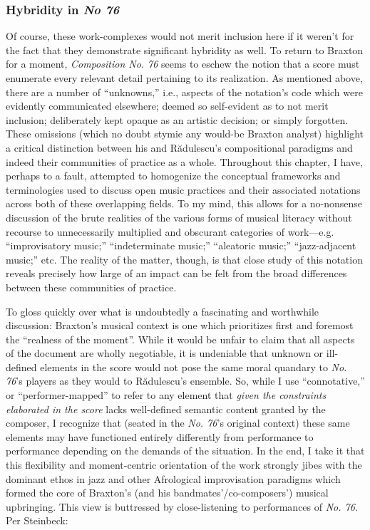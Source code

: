 
    \subsubsection{Hybridity in \textit{No 76}}

        Of course, these work-complexes would not merit inclusion here if it weren't for the fact that they demonstrate significant hybridity as well. To return to Braxton for a moment, \textit{Composition No. 76} seems to eschew the notion that a score must enumerate every relevant detail pertaining to its realization. As mentioned above, there are a number of ``unknowns,'' i.e., aspects of the notation's code which were evidently communicated elsewhere; deemed so self-evident as to not merit inclusion; deliberately kept opaque as an artistic decision; or simply forgotten. These omissions (which no doubt stymie any would-be Braxton analyst) highlight a critical distinction between his and R\u{a}dulescu's compositional paradigms and indeed their communities of practice as a whole. Throughout this chapter, I have, perhaps to a fault, attempted to homogenize the conceptual frameworks and terminologies used to discuss open music practices and their associated notations across both of these overlapping fields. To my mind, this allows for a no-nonsense discussion of the brute realities of the various forms of musical literacy without recourse to unnecessarily multiplied and obscurant categories of work---e.g. ``improvisatory music;'' ``indeterminate music;'' ``aleatoric music;'' ``jazz-adjacent music;'' etc. The reality of the matter, though, is that close study of this notation reveals precisely how large of an impact can be felt from the broad differences between these communities of practice.

        To gloss quickly over what is undoubtedly a fascinating and worthwhile discussion: Braxton's musical context is one which prioritizes first and foremost the ``realness of the moment''.\autocite[149]{Braxton_1988} While it would be unfair to claim that all aspects of the document are wholly negotiable, it is undeniable that unknown or ill-defined elements in the score would not pose the same moral quandary to \textit{No. 76}'s players as they would to R\u{a}dulescu's ensemble. So, while I use ``connotative,'' or ``performer-mapped'' to refer to any element that \textit{given the constraints elaborated in the score} lacks well-defined semantic content granted by the composer, I recognize that (seated in the \textit{No. 76}'s original context) these same elements may have functioned entirely differently from performance to performance depending on the demands of the situation. In the end, I take it that this flexibility and moment-centric orientation of the work strongly jibes with the dominant ethos in jazz and other Afrological improvisation paradigms which formed the core of Braxton's (and his bandmates'/co-composers') musical upbringing. This view is buttressed by close-listening to performances of \textit{No. 76}. Per Steinbeck:

